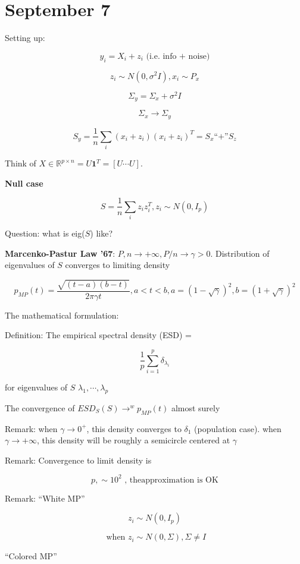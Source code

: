 \documentclass[12pt]{article}
\theoremstyle{plain}
\begin{document}
\part*{September 7}

Setting up:

$$ y_i = X_i + z_i \text{ (i.e. info + noise)} $$

$$ z_i \sim N(0, \sigma^2I), x_i \sim P_x $$

$$ \Sigma_y = \Sigma_x + \sigma^2 I $$

$$ \Sigma_x \rightarrow \Sigma_y $$

$$ S_y = \frac{1}{n} \sum_i (x_i + z_i ) (x_i + z_i)^T = S_x \text{``+''} S_z $$

Think of $X \in \mathbb{R}^{p \times n} = U \pmb{1}^T = [U \cdots U]$.

\textbf{Null case}

$$ S = \frac{1}{n} \sum_i z_i z_i^T , z_i \sim N(0, I_p) $$

Question: what is eig($S$) like?

\textbf{Marcenko-Pastur Law '67}: $ P, n \rightarrow + \infty, P/n \rightarrow \gamma > 0 $. Distribution of eigenvalues of $S$ converges to limiting density

$$p_{MP} (t) = \frac{\sqrt{(t-a)(b-t)}}{2\pi \gamma t}, a < t < b, a = (1-\sqrt{\gamma})^2 , b = (1+\sqrt{\gamma})^2$$

The mathematical formulation:

Definition: The empirical spectral density (ESD) =

$$ \frac{1}{p} \sum_{i=1}^p \delta_{\lambda_i} $$

for eigenvalues of $S$ $\lambda_1 , \cdots, \lambda_p$

The convergence of $ESD_S(S) \rightarrow^w p_{MP} (t)$ almost surely

Remark: when $\gamma \rightarrow 0^+$, this density converges to $\delta_1$ (population case). when $\gamma \rightarrow +\infty$, this density will be roughly a semicircle centered at $\gamma$


Remark: Convergence to limit density is 

$$ p , \sim 10^2 \text{ , theapproximation is OK} $$

Remark: ``White MP''

$$ z_i \sim N(0, I_p) $$

$$ \text{ when } z_i \sim N(0, \Sigma), \Sigma \neq I $$

``Colored MP''
\end{document}
